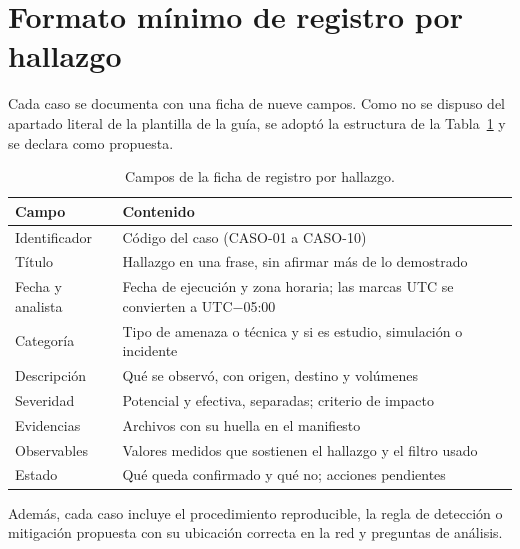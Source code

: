 
\section{Formato mínimo de registro por hallazgo}
Cada caso se documenta con una ficha de nueve campos. Como no se dispuso del apartado literal de la plantilla de la guía, se adoptó la estructura de la Tabla~\ref{tab:formato} y se declara como propuesta.

\begin{table}[H]\centering\small\caption{Campos de la ficha de registro por hallazgo.}\label{tab:formato}
\begin{tabularx}{\linewidth}{@{}p{3.2cm}X@{}}\toprule
\textbf{Campo} & \textbf{Contenido}\\\midrule
Identificador & Código del caso (CASO-01 a CASO-10)\\
Título & Hallazgo en una frase, sin afirmar más de lo demostrado\\
Fecha y analista & Fecha de ejecución y zona horaria; las marcas UTC se convierten a UTC$-$05:00\\
Categoría & Tipo de amenaza o técnica y si es estudio, simulación o incidente\\
Descripción & Qué se observó, con origen, destino y volúmenes\\
Severidad & Potencial y efectiva, separadas; criterio de impacto\\
Evidencias & Archivos con su huella en el manifiesto\\
Observables & Valores medidos que sostienen el hallazgo y el filtro usado\\
Estado & Qué queda confirmado y qué no; acciones pendientes\\
\bottomrule\end{tabularx}\end{table}

Además, cada caso incluye el procedimiento reproducible, la regla de detección o mitigación propuesta con su ubicación correcta en la red y preguntas de análisis.
